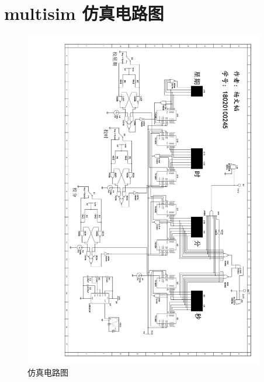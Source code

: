 \newpage
\appendix

\section{multisim 仿真电路图}

\begin{figure}[hbtp]
	\centering
	\includegraphics[width=10.5cm]{figure/DigitalClock}
	\caption{仿真电路图}\label{fig:DigitalClock}
\end{figure}